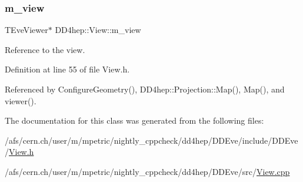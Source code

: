 \subsubsection{\texorpdfstring{m\+\_\+view}{m\_view}}
{\footnotesize\ttfamily T\+Eve\+Viewer$\ast$ D\+D4hep\+::\+View\+::m\+\_\+view\hspace{0.3cm}{\ttfamily [protected]}}



Reference to the view. 



Definition at line 55 of file View.\+h.



Referenced by Configure\+Geometry(), D\+D4hep\+::\+Projection\+::\+Map(), Map(), and viewer().



The documentation for this class was generated from the following files\+:\begin{DoxyCompactItemize}
\item 
/afs/cern.\+ch/user/m/mpetric/nightly\+\_\+cppcheck/dd4hep/\+D\+D\+Eve/include/\+D\+D\+Eve/\hyperlink{_view_8h}{View.\+h}\item 
/afs/cern.\+ch/user/m/mpetric/nightly\+\_\+cppcheck/dd4hep/\+D\+D\+Eve/src/\hyperlink{_view_8cpp}{View.\+cpp}\end{DoxyCompactItemize}
